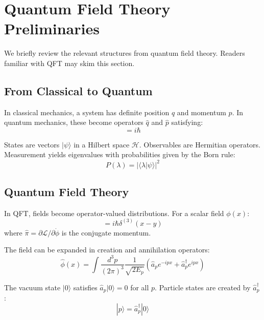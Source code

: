 \documentclass[12pt]{article}
\begin{document}
\section{Quantum Field Theory Preliminaries}

We briefly review the relevant structures from quantum field theory. Readers familiar with QFT may skim this section.

\subsection{From Classical to Quantum}

In classical mechanics, a system has definite position $q$ and momentum $p$. In quantum mechanics, these become operators $\hat{q}$ and $\hat{p}$ satisfying:
\begin{equation}
    [\hat{q}, \hat{p}] = i\hbar
\end{equation}

States are vectors $|\psi\rangle$ in a Hilbert space $\mathcal{H}$. Observables are Hermitian operators. Measurement yields eigenvalues with probabilities given by the Born rule:
\begin{equation}
    P(\lambda) = |\langle \lambda | \psi \rangle|^2
\end{equation}

\subsection{Quantum Field Theory}

In QFT, fields become operator-valued distributions. For a scalar field $\phi(x)$:
\begin{equation}
    [\hat{\phi}(x), \hat{\pi}(y)] = i\hbar \delta^{(3)}(x - y)
\end{equation}
where $\hat{\pi} = \partial \mathcal{L} / \partial \dot{\phi}$ is the conjugate momentum.

The field can be expanded in creation and annihilation operators:
\begin{equation}
    \hat{\phi}(x) = \int \frac{d^3 p}{(2\pi)^3} \frac{1}{\sqrt{2E_p}} \left( \hat{a}_p e^{-ipx} + \hat{a}_p^\dagger e^{ipx} \right)
\end{equation}

The vacuum state $|0\rangle$ satisfies $\hat{a}_p |0\rangle = 0$ for all $p$. Particle states are created by $\hat{a}_p^\dagger$:
\begin{equation}
    |p\rangle = \hat{a}_p^\dagger |0\rangle
\end{equation}
\end{document}
